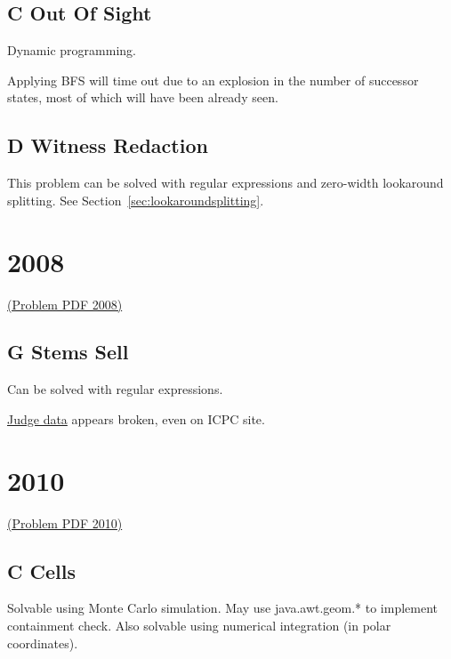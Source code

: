 \subsection{C Out Of Sight}
\label{sec:2007-c-sight}

Dynamic programming.  

Applying BFS will time out due to an explosion in the number
of successor states, most of which will have been already seen.

\subsection{D Witness Redaction}
\label{sec:2007-d-witness}
This problem can be solved with regular expressions and zero-width lookaround splitting.
See Section~\ref{sec:lookaroundsplitting}.

\section{2008}
\href{http://midatl.radford.edu/docs/pastProblems/08contest/MidAtlantic2008.pdf}{(Problem PDF 2008)}

\subsection{G Stems Sell}
\label{sec:2008-g-stems}

Can be solved with regular expressions.

\href{http://midatl.radford.edu/docs/pastProblems/08contest/JudgingData/G-stems/}{Judge data}
appears broken, even on ICPC site.


\section{2010}
\href{http://midatl.radford.edu/docs/pastProblems/10contest/MidAtlantic2010.pdf}{(Problem PDF 2010)}

\subsection{C Cells}
\label{sec:2010-c-cells}

Solvable using Monte Carlo simulation.  May use java.awt.geom.* to implement containment check.
Also solvable using numerical integration (in polar coordinates).

